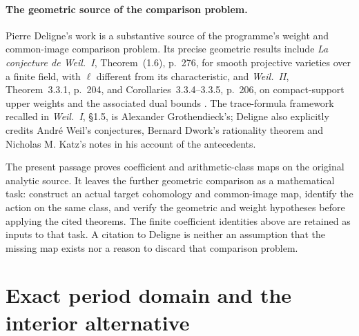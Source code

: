 \documentclass[11pt,a4paper]{article}
\begin{document}
\paragraph{The geometric source of the comparison problem.}
Pierre Deligne's work is a substantive source of the programme's
weight and common-image comparison problem. Its precise geometric
results include \emph{La conjecture de Weil.~I}, Theorem~(1.6),
p.~276, for smooth projective varieties over a finite field, with
$\ell$ different from its characteristic, and \emph{Weil.~II},
Theorem~3.3.1, p.~204, and Corollaries~3.3.4--3.3.5, p.~206,
on compact-support upper weights and the associated dual bounds
\cite{human:deligne1974-weil1,human:deligne1980-weil2}.
The trace-formula framework recalled in \emph{Weil.~I}, \S1.5,
is Alexander Grothendieck's; Deligne also explicitly credits
Andr\'e Weil's conjectures, Bernard Dwork's rationality theorem
and Nicholas M. Katz's notes in his account of the antecedents.

The present passage proves coefficient and arithmetic-class maps
on the original analytic source. It leaves the further geometric
comparison as a mathematical task: construct an actual target
cohomology and common-image map, identify the action on the same
class, and verify the geometric and weight hypotheses before
applying the cited theorems. The finite coefficient identities
above are retained as inputs to that task. A citation to Deligne
is neither an assumption that the missing map exists nor a reason
to discard that comparison problem.



\section{Exact period domain and the interior alternative}
\label{sec:AKS-radius}
\end{document}
